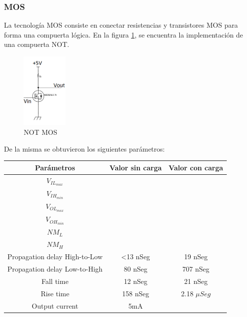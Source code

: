 \subsubsection{MOS}
La tecnología MOS consiste en conectar resistencias y transistores MOS para forma una compuerta lógica. En la figura \ref{fig:eje1_3}, se encuentra la implementación de una compuerta NOT.
\begin{figure}[H]
	\centering
	\includegraphics[width=0.2\textwidth]{Ejercicio1/MOS.png}
	\caption{NOT MOS}
	\label{fig:eje1_3}
\end{figure}
De la misma se obtuvieron los siguientes parámetros:
\begin{table}[H]
	\centering
	\begin{tabular}{|c|c|c|}
		\hline
		Parámetros & Valor sin carga & Valor con carga\\
		\hline
		$V_{IL_{max}}$ & & \\
		\hline
		$V_{IH_{min}}$ & & \\
		\hline
		$V_{OL_{max}}$ & & \\
		\hline
		$V_{OH_{min}}$ & & \\
		\hline
		$NM_{L}$ & & \\
		\hline
		$NM_{H}$ & & \\
		\hline
		Propagation delay High-to-Low & <13 nSeg & 19 nSeg\\
		\hline
		Propagation delay Low-to-High & 80 nSeg & 707 nSeg\\
		\hline
		Fall time & 12 nSeg & 21 nSeg\\
		\hline
		Rise time & 158 nSeg & 2.18 $\mu Seg$\\
		\hline
		Output current & 5mA & \\
		\hline
	\end{tabular}
\end{table}

